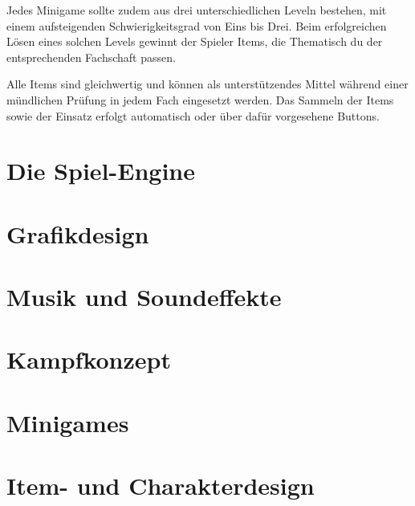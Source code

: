 Jedes Minigame sollte zudem aus drei unterschiedlichen Leveln bestehen, mit einem aufsteigenden Schwierigkeitsgrad von Eins bis Drei. Beim erfolgreichen Lösen eines solchen Levels gewinnt der Spieler Items, die Thematisch du der entsprechenden Fachschaft passen.

Alle Items sind gleichwertig und können als unterstützendes Mittel während einer mündlichen Prüfung in jedem Fach eingesetzt werden. Das Sammeln der Items sowie der Einsatz erfolgt automatisch oder über dafür vorgesehene Buttons.

\section{Die Spiel-Engine}


\section{Grafikdesign}


\section{Musik und Soundeffekte}


\section{Kampfkonzept}


\section{Minigames}


\section{Item- und Charakterdesign}



